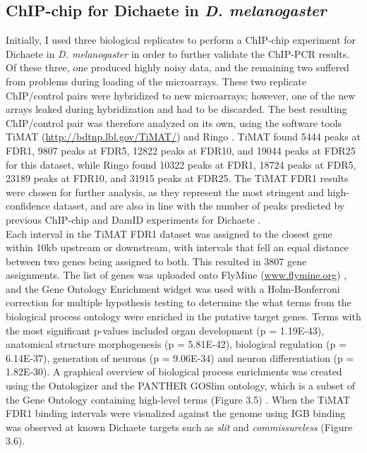 \subsection{ChIP-chip for Dichaete in \emph{D. melanogaster}}
Initially, I used three biological replicates to perform a ChIP-chip experiment for Dichaete in \emph{D. melanogaster} in order to further validate the ChIP-PCR results. Of these three, one produced highly noisy data, and the remaining two suffered from problems during loading of the microarrays. These two replicate ChIP/control pairs were hybridized to new microarrays; however, one of the new arrays leaked during hybridization and had to be discarded. The best resulting ChIP/control pair was therefore analyzed on its own, using the software tools TiMAT (\url{http://bdtnp.lbl.gov/TiMAT/}) and Ringo \citep{toedling_ringo_2007}. TiMAT found 5444 peaks at FDR1, 9807 peaks at FDR5, 12822 peaks at FDR10, and 19044 peaks at FDR25 for this dataset, while Ringo found 10322 peaks at FDR1, 18724 peaks at FDR5, 23189 peaks at FDR10, and 31915 peaks at FDR25. The TiMAT FDR1 results were chosen for further analysis, as they represent the most stringent and high-confidence dataset, and are also in line with the number of peaks predicted by previous ChIP-chip and DamID experiments for Dichaete \citep{aleksic_role_2013}.\\

Each interval in the TiMAT FDR1 dataset was assigned to the closest gene within 10kb upstream or downstream, with intervals that fell an equal distance between two genes being assigned to both. This resulted in 3807 gene assignments. The list of genes was uploaded onto FlyMine (\url{www.flymine.org}) \citep{lyne_flymine:_2007}, and the Gene Ontology Enrichment widget was used with a Holm-Bonferroni correction for multiple hypothesis testing to determine the what terms from the biological process ontology were enriched in the putative target genes. Terms with the most significant p-values included organ development (p = 1.19E-43), anatomical structure morphogenesis (p = 5.81E-42), biological regulation (p = 6.14E-37), generation of neurons (p = 9.06E-34) and neuron differentiation (p = 1.82E-30). A graphical overview of biological process enrichments was created using the Ontologizer and the PANTHER GOSlim ontology, which is a subset of the Gene Ontology containing high-level terms (Figure 3.5) \citep{bauer_ontologizer_2008}. When the TiMAT FDR1 binding intervals were visualized against the genome using IGB \citep{nicol_integrated_2009} binding was observed at known Dichaete targets such as \emph{slit} and \emph{commissureless} (Figure 3.6).\\

